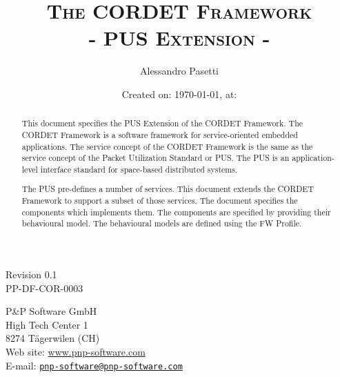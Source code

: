 \documentclass[a4paper,10pt]{article}
\title{\textsc{The CORDET Framework} \\ \textsc{- PUS Extension -}}
\author{Alessandro Pasetti }
\date{Created on: \today{}, at: \currenttime{}}
\newcommand{\docIssue}{0.1}						%
\newcommand{\docRefNumber}{PP-DF-COR-0003}		%
\begin{document}
\maketitle

\begin{center}
Revision \docIssue{}\\
\docRefNumber{}
\end{center}

\vspace{1cm}

\begin{center}
P\&P Software GmbH \\
High Tech Center 1 \\
8274 T\"{a}gerwilen (CH)\\
\vspace{2mm}
Web site: \url{www.pnp-software.com}\\
E-mail: \href{mailto:pnp-software@pnp-software.com}{\nolinkurl{pnp-software@pnp-software.com}} 
\end{center}

\vspace{0.5cm}

\begin{table}[ht]
\begin{center}
\begin{tabular}{p{11.7cm}}
\\
\hline
\end{tabular}
\end{center}
\end{table}
\begin{abstract}
This document specifies the PUS Extension of the CORDET Framework. The CORDET Framework is a software framework for service-oriented embedded applications. The service concept of the CORDET Framework is the same as the service concept of the Packet Utilization Standard or PUS. The PUS is an application-level interface standard for space-based distributed systems.

The PUS pre-defines a number of services. This document extends the CORDET Framework to support a subset of those services. The document specifies the components which implements them. The components are specified by providing their behavioural model. The behavioural models are defined using the FW Profile.

\end{abstract}
\begin{table}[ht]
\begin{center}
\begin{tabular}{p{11.7cm}}
\\
\hline
\end{tabular}
\end{center}
\end{table}
\end{document}
